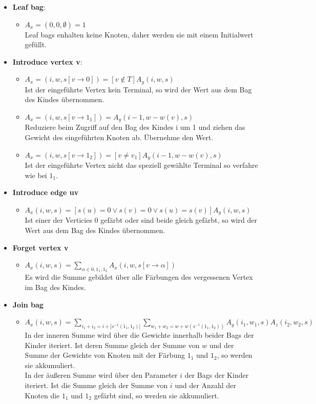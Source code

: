 \begin{itemize}
\item \textbf{Leaf bag}:
\begin{itemize}
\item $A_x=(0,0,\emptyset) = 1$\\Leaf bags enhalten keine Knoten, daher werden sie mit einem Initialwert gefüllt.
\end{itemize}
\item \textbf{Introduce vertex v}:
\begin{itemize}
\item $A_x=(i,w,s[v\rightarrow 0]) = [v \notin T]A_y(i,w,s)$\\ Ist der eingeführte Vertex kein Terminal, so wird der Wert aus dem Bag des Kindes übernommen.
\item $A_x=(i,w,s[v\rightarrow 1_1]) = A_y(i-1,w-w(v),s)$\\ Reduziere beim Zugriff auf den Bag des Kindes i um 1 und ziehen das Gewicht des eingeführten Knoten ab. Übernehme den Wert.
\item $A_x=(i,w,s[v\rightarrow 1_2]) =[v \neq v_1] A_y(i-1,w-w(v),s)$\\ Ist der eingeführte Vertex nicht das speziell gewählte Terminal so verfahre wie bei $1_1$.
\end{itemize}
\item \textbf{Introduce edge uv}
\begin{itemize}
\item $A_x(i,w,s) = [s(u) = 0 \vee s(v) = 0 \vee s(u) = s(v)]A_y(i,w,s)$\\ Ist einer der Verticies $0$ gefärbt oder sind beide gleich gefärbt, so wird der Wert aus dem Bag des Kindes übernommen.
\end{itemize}
\item \textbf{Forget vertex v}
\begin{itemize}
\item $A_x(i,w,s) = \sum\limits_{\alpha \in {0,1_1,1_2}} A_x(i,w,s[v \rightarrow \alpha]) $\\ Es wird die Summe gebildet über alle Färbungen des vergessenen Vertex im Bag des Kindes.
\end{itemize}
\item \textbf{Join bag}
\begin{itemize}
\item $A_x(i,w,s) = \sum\limits_{i_1+i_2=i+|s^{-1}({1_1,1_2})|} \sum\limits_{w_1+w_2=w+w(s^{-1}({1_1,1_2}))} A_y(i_1,w_1,s)A_z(i_2,w_2,s) $\\In der inneren Summe wird über die Gewichte innerhalb beider Bags der Kinder iteriert. Ist deren Summe gleich der Summe von $w$ und der Summe der Gewichte von Knoten mit der Färbung $1_1$ und $1_2$, so werden sie akkumuliert.
\\In der äußeren Summe wird über den Parameter $i$ der Bags der Kinder iteriert. Ist die Summe gleich der Summe von $i$ und der Anzahl der Knoten die $1_1$ und $1_2$ gefärbt sind, so werden sie akkumuliert.
\end{itemize}
\end{itemize}

